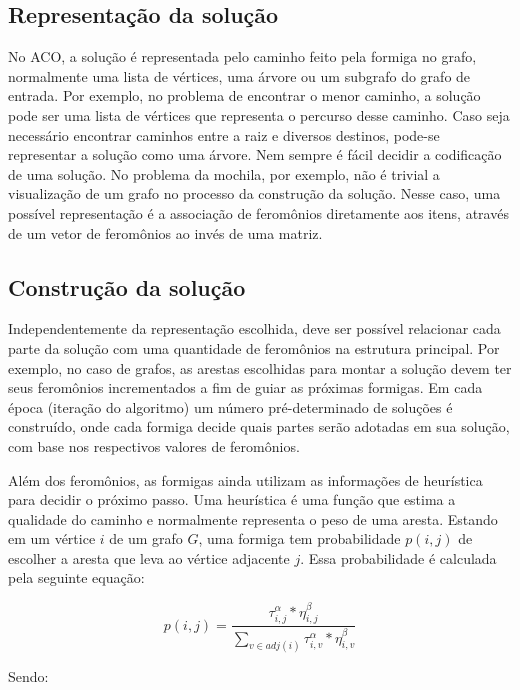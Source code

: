 \FloatBarrier
\subsection{Representação da solução}
No ACO, a solução é representada pelo caminho feito pela formiga no grafo, normalmente uma lista de vértices, uma árvore ou um subgrafo do grafo de entrada. Por exemplo, no problema de encontrar o menor caminho, a solução pode ser uma lista de vértices que representa o percurso desse caminho. Caso seja necessário encontrar caminhos entre a raiz e diversos destinos, pode-se representar a solução como uma árvore. Nem sempre é fácil decidir a codificação de uma solução. No problema da mochila, por exemplo, não é trivial a visualização de um grafo no processo da construção da solução. Nesse caso, uma possível representação é a associação de feromônios diretamente aos itens, através de um vetor de feromônios ao invés de uma matriz.

\subsection{Construção da solução} \label{section_construcao_solucao}
\label{section_otimizacao_aco_construcao}
Independentemente da representação escolhida, deve ser possível relacionar cada parte da solução com uma quantidade de feromônios na estrutura principal. Por exemplo, no caso de grafos, as arestas escolhidas para montar a solução devem ter seus feromônios incrementados a fim de guiar as próximas formigas. Em cada época (iteração do algoritmo) um número pré-determinado de soluções é construído, onde cada formiga decide quais partes serão adotadas em sua solução, com base nos respectivos valores de feromônios.

Além dos feromônios, as formigas ainda utilizam as informações de heurística para decidir o próximo passo. Uma heurística é uma função que estima a qualidade do caminho e normalmente representa o peso de uma aresta. Estando em um vértice $i$ de um grafo $G$, uma formiga tem probabilidade $p(i,j)$ de escolher a aresta que leva ao vértice adjacente $j$. Essa probabilidade é calculada pela seguinte equação:

\begin{equation}p(i,j) = \frac{\tau_{i,j}^\alpha * \eta_{i,j}^\beta}{\sum_{v \in adj(i)} \tau_{i,v}^\alpha * \eta_{i,v}^\beta}\end{equation}

Sendo:

